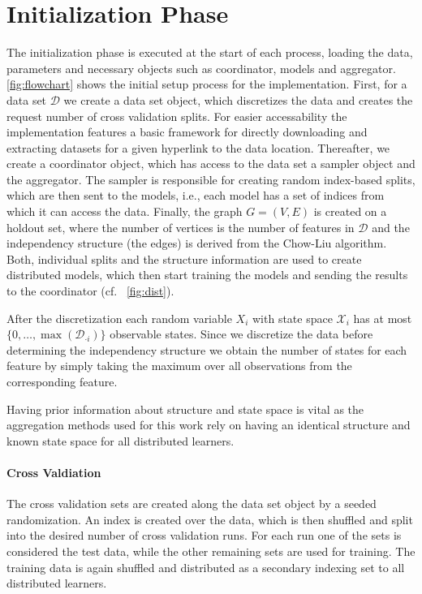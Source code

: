\section{Initialization Phase}

The initialization phase is executed at the start of each process, loading the data, parameters and necessary objects such as coordinator, models and aggregator.
\fig \ref{fig:flowchart} shows the initial setup process for the implementation.
First, for a data set $\mathcal{D}$ we create a data set object, which discretizes the data and creates the request number of cross validation splits. 
For easier accessability the implementation features a basic framework for directly downloading and extracting datasets for a given hyperlink to the data location.
Thereafter, we create a coordinator object, which has access to the data set a sampler object and the aggregator.
The sampler is responsible for creating random index-based splits, which are then sent to the models, i.e., each model has a set of indices from which it can access the data.
Finally, the graph $G=(V,E)$ is created on a holdout set, where the number of vertices is the number of features in $\mathcal{D}$ and the independency structure (the edges) is derived from the Chow-Liu algorithm.
Both, individual splits and the structure information are used to create distributed models, which then start training the models and sending the results to the coordinator (cf. \fig~\ref{fig:dist}).

After the discretization each random variable $X_i$ with state space $\mathcal{X}_i$ has at most $\{0, \ldots, \max(\mathcal{D}_{\cdot i})\}$ observable states.
Since we discretize the data before determining the independency structure we obtain the number of states for each feature by simply taking the maximum over all observations from the corresponding feature. 

Having prior information about structure and state space is vital as the aggregation methods used for this work rely on having an identical structure and known state space for all distributed learners.

\paragraph*{Cross Valdiation}
The cross validation sets are created along the data set object by a seeded randomization.
An index is created over the data, which is then shuffled and split into the desired number of cross validation runs.
For each run one of the sets is considered the test data, while the other remaining sets are used for training.
The training data is again shuffled and distributed as a secondary indexing set to all distributed learners.

